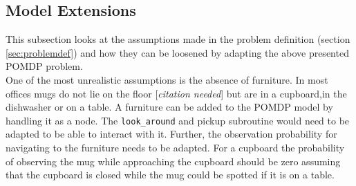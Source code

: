 \subsection{Model Extensions}\label{subsec:POMDP_extensions}
This subsection looks at the assumptions made in the problem definition (section \ref{sec:problemdef}) and how they can be loosened by adapting the above presented POMDP problem. \\

One of the most unrealistic assumptions is the absence of furniture. In most offices mugs do not lie on the floor [\textit{citation needed}] but are in a cupboard,in the dishwasher or on a table. A furniture can be added to the POMDP model by handling it as a node. The \texttt{look\_around} and pickup subroutine would need to be adapted to be able to interact with it. Further, the observation probability for navigating to the furniture needs to be adapted. For a cupboard the probability of observing the mug while approaching the cupboard should be zero assuming that the cupboard is closed while the mug could be spotted if it is on a table.\\

